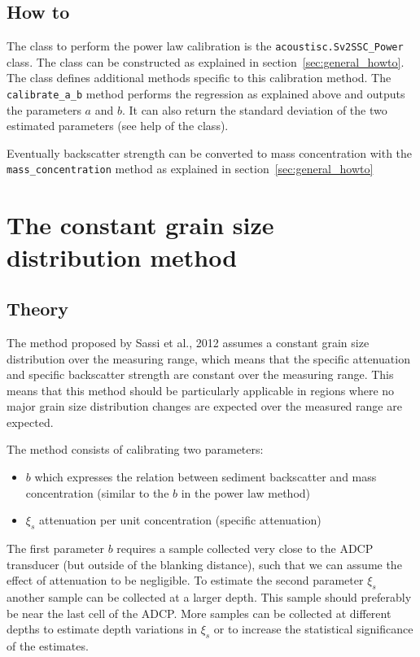 \documentclass[]{article}
\begin{document}
\subsection{How to}
The class to perform the power law calibration is the \lstinline!acoustisc.Sv2SSC_Power! class. The class can be constructed as explained in section~\ref{sec:general_howto}. The class defines additional methods specific to this calibration method. The \lstinline!calibrate_a_b! method performs the regression as explained above and outputs the parameters $a$ and $b$. It can also return the standard deviation of the two estimated parameters (see help of the class). 

Eventually backscatter strength can be converted to mass concentration with the \lstinline!mass_concentration! method as explained in section~\ref{sec:general_howto}

\section{The constant grain size distribution method}

\subsection{Theory}
The method proposed by Sassi et al., 2012 assumes a constant grain size distribution over the measuring range, which means that the specific attenuation and specific backscatter strength are constant over the measuring range. This means that this method should be particularly applicable in regions where no major grain size distribution changes are expected over the measured range are expected.

The method consists of calibrating two parameters:
\begin{itemize}
  \item $b$ which expresses the relation between sediment backscatter and mass concentration (similar to the $b$ in the power law method)
  \item $\xi_s$ attenuation per unit concentration (specific attenuation)
\end{itemize}
The first parameter $b$ requires a sample collected very close to the ADCP transducer (but outside of the blanking distance), such that we can assume the effect of attenuation to be negligible.
To estimate the second parameter $\xi_s$ another sample can be collected at a larger depth. This sample should preferably be near the last cell of the ADCP. More samples can be collected at different depths to estimate depth variations in $\xi_s$ or to increase the statistical significance of the estimates.
\end{document}
